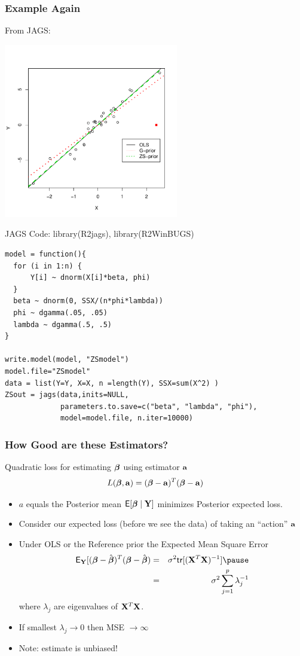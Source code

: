 \documentclass[handout]{beamer}
\begin{document}
\begin{frame} \frametitle{Example Again}
  From JAGS:

\includegraphics[height=3in]{ZSprior.pdf}

\end{frame}

\begin{frame}[fragile]{JAGS Code: library(R2jags), library(R2WinBUGS)}
\begin{verbatim}
model = function(){
  for (i in 1:n) {
      Y[i] ~ dnorm(X[i]*beta, phi)
  }
  beta ~ dnorm(0, SSX/(n*phi*lambda))
  phi ~ dgamma(.05, .05)
  lambda ~ dgamma(.5, .5)
}

write.model(model, "ZSmodel")
model.file="ZSmodel"
data = list(Y=Y, X=X, n =length(Y), SSX=sum(X^2) )
ZSout = jags(data,inits=NULL, 
             parameters.to.save=c("beta", "lambda", "phi"), 
             model=model.file, n.iter=10000)
\end{verbatim}
\end{frame}
\begin{frame}
  \frametitle{How Good are these Estimators?}
Quadratic loss for estimating  $\boldsymbol{\beta}$ using estimator $\mathbf{a}$
$$ L(\boldsymbol{\beta}, \mathbf{a}) =  ( \boldsymbol{\beta} - \mathbf{a})^T(\boldsymbol{\beta} -\mathbf{a})$$ \pause

\begin{itemize}
\item $a$ equals the Posterior mean $\textsf{E}[\boldsymbol{\beta} \mid \mathbf{Y}]$ minimizes
  Posterior expected loss. \pause
\item Consider our expected loss (before we see the data) of taking an
``action'' $\mathbf{a}$ \pause
\item Under OLS or the  Reference prior the Expected Mean Square Error  \pause
  \begin{eqnarray*}
\E_\Y[( \b - \bhat)^T(\b -\bhat) & = &\sigma^2
  \tr[(\X^T\X)^{-1}] \pause \\
 & = & \sigma^2 \sum_{j=1}^p \lambda_j^{-1}
  \end{eqnarray*}
where $\lambda_j$ are eigenvalues of $\mathbf{X}^T\mathbf{X}$.
\pause
\item If smallest $\lambda_j \to 0$ then MSE  $\to \infty$
\item Note: estimate is unbiased! 
\end{itemize}
\end{frame}
\end{document}
